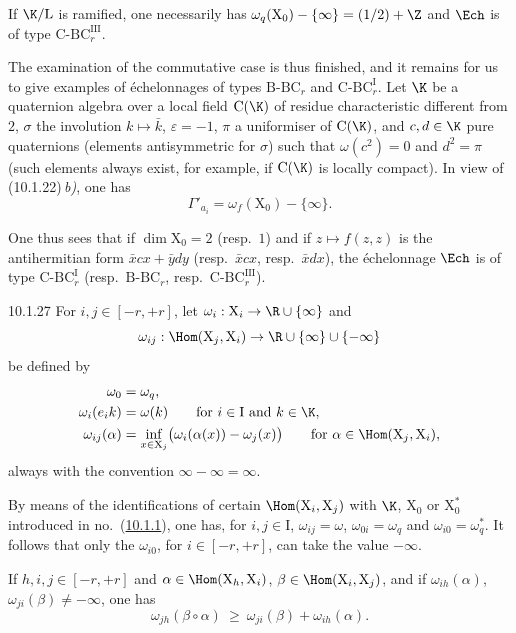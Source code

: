 \documentclass[12pt,a4paper,oneside,english]{smfart}
\makeatletter
\newcommand{\btanchor}[1]{\leavevmode\Hy@raisedlink{\hypertarget{bt:#1}{}}}
\newcommand{\btref}[1]{\hyperlink{bt:#1}{#1}}
\theoremstyle{definition}
\theoremstyle{bt}
\makeatother
\begin{document}
If $\K/\mathrm{L}$ is ramified, one necessarily has
$\omega_q(\mathrm{X}_0)-\{\infty\}=(1/2)+\Z$ and $\Ech$ is of type
$\mathrm{C}\text{-}\mathrm{BC}_r^{\mathrm{III}}$.

The examination of the commutative case is thus finished, and it remains for us
to give examples of échelonnages of types $\mathrm{B}\text{-}\mathrm{BC}_r$ and
$\mathrm{C}\text{-}\mathrm{BC}_r^{\mathrm{I}}$. Let $\K$ be a quaternion algebra
over a local field $\mathrm{C}(\K)$ of residue characteristic different from
$2$, $\sigma$ the involution $k\mapsto \bar k$, $\varepsilon=-1$, $\pi$ a
uniformiser of $\mathrm{C}(\K)$, and $c,d\in\K$ pure quaternions (elements
antisymmetric for $\sigma$) such that $\omega(c^2)=0$ and $d^2=\pi$ (such
elements always exist, for example, if $\mathrm{C}(\K)$ is locally compact). In
view of (10.1.22)\,\emph{b)}, one has
\[
\Gamma'_{a_i}=\omega_f(\mathrm{X}_0)-\{\infty\}.
\]

One thus sees that if $\dim \mathrm{X}_0=2$ (resp.\ $1$) and if $z\mapsto
f(z,z)$ is the antihermitian form $\bar x c x+\bar y d y$ (resp.\ $\bar x c x$,
resp.\ $\bar x d x$), the échelonnage $\Ech$ is of type
$\mathrm{C}\text{-}\mathrm{BC}_r^{\mathrm{I}}$ (resp.\
$\mathrm{B}\text{-}\mathrm{BC}_r$, resp.\
$\mathrm{C}\text{-}\mathrm{BC}_r^{\mathrm{III}}$).

\num{10.1.27}\btanchor{10.1.27} For $i,j\in[-r,+r]$, let
$\omega_i:\mathrm{X}_i\to\R\cup\{\infty\}$ and
\[
\omega_{ij}:\Hom(\mathrm{X}_j,\mathrm{X}_i)\to\R\cup\{\infty\}\cup\{-\infty\}
\]
be defined by
\begin{align*}
\omega_0 &= \omega_q,\\
\omega_i(e_i k) &= \omega(k)\qquad\text{for } i\in\mathrm{I}\text{ and } k\in\K,\\
\omega_{ij}(\alpha) &= \inf_{x\in \mathrm{X}_j}\bigl(\omega_i(\alpha(x))-\omega_j(x)\bigr)
   \qquad\text{for } \alpha\in\Hom(\mathrm{X}_j,\mathrm{X}_i),
\end{align*}
always with the convention $\infty-\infty=\infty$.

By means of the identifications of certain
$\Hom(\mathrm{X}_i,\mathrm{X}_j)$ with $\K$, $\mathrm{X}_0$ or
$\mathrm{X}_0^{*}$ introduced in no.~(\btref{10.1.1}), one has, for
$i,j\in\mathrm{I}$, $\omega_{ij}=\omega$, $\omega_{0i}=\omega_q$ and
$\omega_{i0}=\omega_q^{*}$. It follows that only the $\omega_{i0}$, for
$i\in[-r,+r]$, can take the value $-\infty$.

If $h,i,j\in[-r,+r]$ and $\alpha\in\Hom(\mathrm{X}_h,\mathrm{X}_i)$,
$\beta\in\Hom(\mathrm{X}_i,\mathrm{X}_j)$, and if $\omega_{ih}(\alpha)$,
$\omega_{ji}(\beta)\neq-\infty$, one has
\begin{equation*}
\omega_{jh}(\beta\circ\alpha)\ \geqslant\ \omega_{ji}(\beta)+\omega_{ih}(\alpha).
\tag{1}
\end{equation*}
\end{document}
